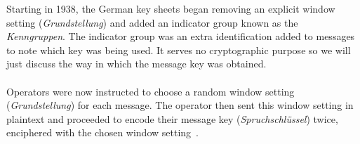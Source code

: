 Starting in 1938, the German key sheets began removing an explicit
window setting (\emph{Grundstellung}) and added an indicator group
known as the \emph{Kenngruppen}. The indicator group was an extra
identification added to messages to note which key was being used. It
serves no cryptographic purpose so we will just discuss the way in
which the message key was obtained.
\\\\Operators were now instructed to choose a random window setting
(\emph{Grundstellung}) for each message. The operator then sent this
window setting in plaintext and proceeded to encode their message key
(\emph{Spruchschlüssel}) twice, enciphered with the chosen window
 setting~\cite[p.~225--226]{Rejewski1981}.
